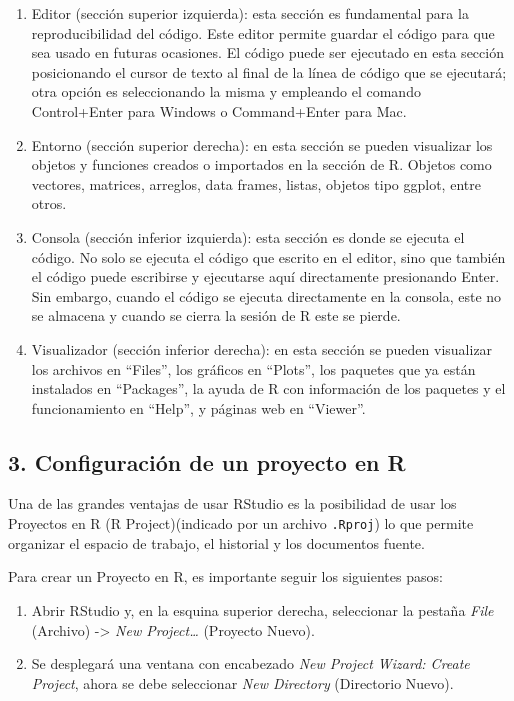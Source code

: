 \documentclass[
]{article}
\providecommand{\tightlist}{%
  \setlength{\itemsep}{0pt}\setlength{\parskip}{0pt}}
\begin{document}
\begin{enumerate}
\def\labelenumi{\arabic{enumi}.}
\item
  Editor (sección superior izquierda): esta sección es fundamental para
  la reproducibilidad del código. Este editor permite guardar el código
  para que sea usado en futuras ocasiones. El código puede ser ejecutado
  en esta sección posicionando el cursor de texto al final de la línea
  de código que se ejecutará; otra opción es seleccionando la misma y
  empleando el comando Control+Enter para Windows o Command+Enter para
  Mac.
\item
  Entorno (sección superior derecha): en esta sección se pueden
  visualizar los objetos y funciones creados o importados en la sección
  de R. Objetos como vectores, matrices, arreglos, data frames, listas,
  objetos tipo ggplot, entre otros.
\item
  Consola (sección inferior izquierda): esta sección es donde se ejecuta
  el código. No solo se ejecuta el código que escrito en el editor, sino
  que también el código puede escribirse y ejecutarse aquí directamente
  presionando Enter. Sin embargo, cuando el código se ejecuta
  directamente en la consola, este no se almacena y cuando se cierra la
  sesión de R este se pierde.
\item
  Visualizador (sección inferior derecha): en esta sección se pueden
  visualizar los archivos en ``Files'', los gráficos en ``Plots'', los
  paquetes que ya están instalados en ``Packages'', la ayuda de R con
  información de los paquetes y el funcionamiento en ``Help'', y páginas
  web en ``Viewer''.
\end{enumerate}

\subsection{3. Configuración de un proyecto en
R}\label{configuraciuxf3n-de-un-proyecto-en-r}

Una de las grandes ventajas de usar RStudio es la posibilidad de usar
los Proyectos en R (R Project)(indicado por un archivo \texttt{.Rproj})
lo que permite organizar el espacio de trabajo, el historial y los
documentos fuente.

Para crear un Proyecto en R, es importante seguir los siguientes pasos:

\begin{enumerate}
\def\labelenumi{(\arabic{enumi})}
\tightlist
\item
  Abrir RStudio y, en la esquina superior derecha, seleccionar la
  pestaña \emph{File} (Archivo) -\textgreater{} \emph{New
  Project\ldots{}} (Proyecto Nuevo).
\item
  Se desplegará una ventana con encabezado \emph{New Project Wizard:
  Create Project}, ahora se debe seleccionar \emph{New Directory}
  (Directorio Nuevo).
\end{enumerate}
\end{document}
